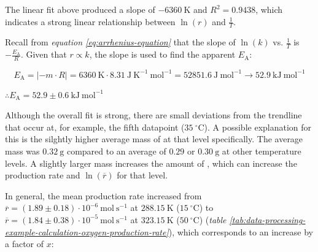 \documentclass[hyphens]{article}
\begin{document}
The linear fit above produced a slope of $-6360\ \text{K}$ and $R^2 = 0.9438$, which indicates a strong linear relationship between $\ln{(r)}$ and $\frac{1}{T}$.

Recall from \textit{equation \ref{eq:arrhenius-equation}} that the slope of $\ln{(k)}$ vs. $\frac{1}{T}$ is $-\frac{E_\text{A}}{R}$. Given that $r \propto k$, the slope is used to find the apparent $E_\text{A}$:

\begin{equation}
  E_\text{A} = |-m \cdot R| = 6360\ \text{K} \cdot 8.31\ \text{J}\ \text{K}^{-1}\ \text{mol}^{-1} = 52851.6\ \text{J}\ \text{mol}^{-1} \rightarrow 52.9\ \text{kJ}\ \text{mol}^{-1}
\end{equation}

\begin{center}
  $\therefore E_\text{A} = 52.9 \pm 0.6\ \text{kJ}\ \text{mol}^{-1}$
\end{center}

Although the overall fit is strong, there are small deviations from the trendline that occur at, for example, the fifth datapoint ($35\ ^\circ \text{C}$). A possible explanation for this is the silghtly higher average mass of  at that level specifically. The average mass was $0.32\ \text{g}$ compared to an average of $0.29$ or $0.30\ \text{g}$ at other temperature levels. A slightly larger  mass increases the amount of , which can increase the  production rate and $\ln{(\overline{r})}$ for that level.

In general, the mean  production rate increased from $\overline{r} = (1.89 \pm 0.18) \cdot 10^{-6}\ \text{mol}\ \text{s}^{-1}$ at $288.15\ \text{K}$ ($15\ ^\circ \text{C}$) to $\overline{r} = (1.84 \pm 0.38) \cdot 10^{-5}\ \text{mol}\ \text{s}^{-1}$ at $323.15\ \text{K}$ ($50\ ^\circ \text{C}$) (\textit{table \ref{tab:data-processing-example-calculation-oxygen-production-rate}}), which corresponds to an increase by a factor of $x$:
\end{document}

